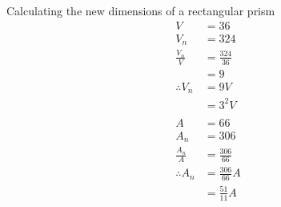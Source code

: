 \begin{wex}{Calculating the new dimensions of a rectangular prism}
{
\begin{align*}
  V &= 36 \\
  V_n &= 324 \\
  \frac{V_n}{V} &= \frac{324}{36} \\
  &= 9 \\
  \therefore V_n &= 9V \\
  &= 3^2 V \\
  \\
  A &= 66 \\
  A_n &= 306 \\
  \frac{A_n}{A} &= \frac{306}{66} \\
  \therefore A_n &= \frac{306}{66}A \\
  &= \frac{51}{11}A\\
\end{align*}
}
\end{wex}
\clearpage


